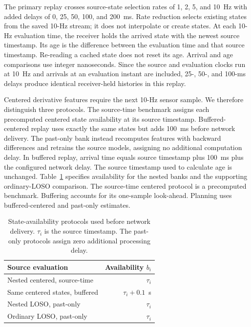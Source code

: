 \documentclass[journal]{IEEEtran}
\newcommand{\newrev}[1]{{#1}}
\begin{document}
The primary replay crosses source-state selection rates of 1, 2, 5, and
10~Hz with added delays of 0, 25, 50, 100, and 200~ms. Rate reduction
selects existing states from the saved 10-Hz stream; it does not interpolate
or create states. At each 10-Hz evaluation time, the receiver holds the
arrived state with the newest source timestamp. Its age is the difference
between the evaluation time and that source timestamp. Re-reading a cached
state does not reset its age. Arrival and age comparisons use integer
nanoseconds. Since the source and evaluation clocks run at 10~Hz and
arrivals at an evaluation instant are included, 25-, 50-, and 100-ms
delays produce identical receiver-held histories in this replay.

\newrev{Centered derivative features require the next 10-Hz sensor
sample. We therefore distinguish three protocols. The source-time
benchmark assigns each precomputed centered state availability at its
source timestamp. Buffered-centered replay uses exactly the same states
but adds 100~ms before network delivery. The past-only bank instead
recomputes features with backward differences and retrains the source
models, assigning no additional computation delay. In buffered replay,
arrival time equals source timestamp plus 100~ms plus the configured
network delay. The source timestamp used to calculate age is unchanged.
Table~\ref{tab:timing_protocols} specifies availability for the nested banks
and the supporting ordinary-LOSO comparison. The source-time centered
protocol is a precomputed benchmark. Buffering accounts for its one-sample
look-ahead. Planning uses buffered-centered and past-only estimates.}

\begin{table}[!tb]
\centering
\small
\newrev{%
\caption{State-availability protocols used before network delivery.
$\tau_i$ is the source timestamp. The past-only protocols assign zero
additional processing delay.}
\label{tab:timing_protocols}
\begin{tabular}{@{}lr@{}}
\toprule
Source evaluation & Availability $b_i$\\
\midrule
Nested centered, source-time & $\tau_i$\\
Same centered states, buffered & $\tau_i+0.1$~s\\
Nested LOSO, past-only & $\tau_i$\\
Ordinary LOSO, past-only & $\tau_i$\\
\bottomrule
\end{tabular}}
\end{table}
\end{document}
